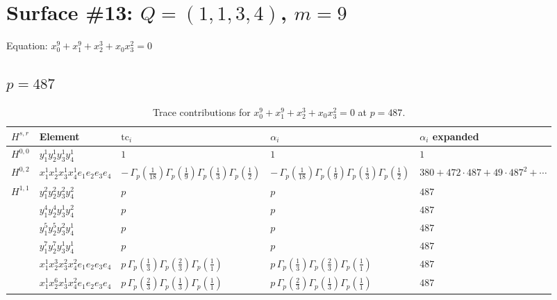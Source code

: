 \documentclass[11pt]{article}
\begin{document}
\newpage

\section*{Surface \#13: $Q=(1, 1, 3, 4)$, $m=9$}

Equation: $x_0^{9} + x_1^{9} + x_2^{3} + x_0 x_3^{2} = 0$

\subsection*{$p = 487$}

\begin{table}[ht]
\centering
\caption{Trace contributions for $x_0^{9} + x_1^{9} + x_2^{3} + x_0 x_3^{2} = 0$ at $p=487$.}\label{tab:deformed-13}
\renewcommand{\arraystretch}{1.1}
{\scriptsize
\begin{tabular}{@{}lllll@{}}
\toprule
$H^{s,r}$ & Element & $\mathrm{tc}_i$ & $\alpha_i$ & $\alpha_i$ expanded \\
\midrule
$H^{0,0}$ & $y_{1}^{1} y_{2}^{1} y_{3}^{1} y_{4}^{1}$ & $1$ & $1$ & $1$ \\
\midrule
$H^{0,2}$ & $x_{1}^{1} x_{2}^{1} x_{3}^{1} x_{4}^{1}  e_{1} e_{2} e_{3} e_{4}$ & $- \, \Gamma_p \left( \frac{1}{18} \right) \Gamma_p \left( \frac{1}{9} \right) \Gamma_p \left( \frac{1}{3} \right) \Gamma_p \left( \frac{1}{2} \right)$ & $- \, \Gamma_p \left( \frac{1}{18} \right) \Gamma_p \left( \frac{1}{9} \right) \Gamma_p \left( \frac{1}{3} \right) \Gamma_p \left( \frac{1}{2} \right)$ & $380{+}472{\cdot}487{+}49{\cdot}487^{2}{+}\cdots$ \\
\midrule
$H^{1,1}$ & $y_{1}^{2} y_{2}^{2} y_{3}^{2} y_{4}^{2}$ & $p \,$ & $p \,$ & $487$ \\
 & $y_{1}^{4} y_{2}^{4} y_{3}^{1} y_{4}^{2}$ & $p \,$ & $p \,$ & $487$ \\
 & $y_{1}^{5} y_{2}^{5} y_{3}^{2} y_{4}^{1}$ & $p \,$ & $p \,$ & $487$ \\
 & $y_{1}^{7} y_{2}^{7} y_{3}^{1} y_{4}^{1}$ & $p \,$ & $p \,$ & $487$ \\
 & $x_{1}^{1} x_{2}^{3} x_{3}^{2} x_{4}^{2}  e_{1} e_{2} e_{3} e_{4}$ & $p \, \Gamma_p \left( \frac{1}{3} \right) \Gamma_p \left( \frac{2}{3} \right) \Gamma_p \left( \frac{1}{1} \right)$ & $p \, \Gamma_p \left( \frac{1}{3} \right) \Gamma_p \left( \frac{2}{3} \right) \Gamma_p \left( \frac{1}{1} \right)$ & $487$ \\
 & $x_{1}^{1} x_{2}^{6} x_{3}^{1} x_{4}^{2}  e_{1} e_{2} e_{3} e_{4}$ & $p \, \Gamma_p \left( \frac{2}{3} \right) \Gamma_p \left( \frac{1}{3} \right) \Gamma_p \left( \frac{1}{1} \right)$ & $p \, \Gamma_p \left( \frac{2}{3} \right) \Gamma_p \left( \frac{1}{3} \right) \Gamma_p \left( \frac{1}{1} \right)$ & $487$ \\

\end{tabular}}
\end{table}
\end{document}
